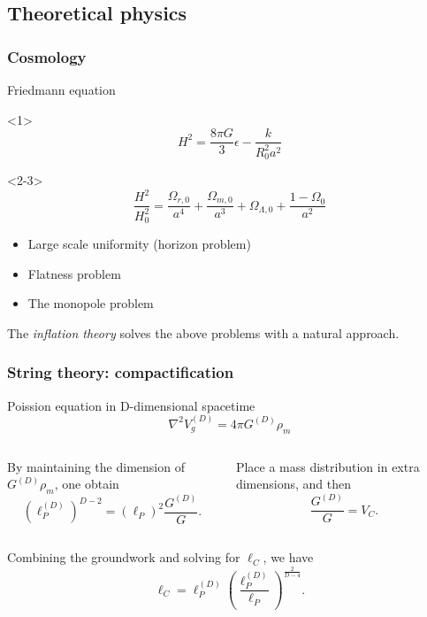 \documentclass{beamer}
\begin{document}
\subsection{Theoretical physics}
\begin{frame}
  \frametitle{Cosmology}
    \begin{alertblock}{Friedmann equation}
      \begin{onlyenv}<1>
        $$H^2 = \frac{8\pi G}{3}\epsilon-\frac{k}{R_0^2a^2}$$
      \end{onlyenv}
      \begin{onlyenv}<2-3>
        $$\frac{H^2}{H_0^2} =
        \frac{\Omega_{r,0}}{a^4} + \frac{\Omega_{m,0}}{a^3} +
        \Omega_{\Lambda,0} + \frac{1-\Omega_0}{a^2}$$
      \end{onlyenv}
  \end{alertblock}
  
  \begin{itemize}
  \item<3> Large scale uniformity (horizon problem)
  \item<3> Flatness problem
  \item<3> The monopole problem
  \end{itemize}
  The \textit{inflation theory} solves the above problems with a natural
  approach.

\end{frame}


\begin{frame}
  \frametitle{String theory: compactification}
  \begin{alertblock}{Poission equation in D-dimensional spacetime}
    $$\nabla^2V_g^{(D)} = 4\pi G^{(D)}\rho_m$$ 
  \end{alertblock}
  \begin{columns}
    By maintaining the dimension of $G^{(D)}\rho_m$, one obtain
    $$(\ell_P^{(D)})^{D-2} = (\ell_P)^2\frac{G^{(D)}}{G}.$$

    Place a mass distribution in extra dimensions, and then 
    $$\frac{G^{(D)}}{G} = V_C.$$
  \end{columns} \pause
  Combining the groundwork and solving for $\ell_C$, we have
  $$\ell_C = \ell_P^{(D)}(\frac{\ell_P^{(D)}}{\ell_P})^{\frac{2}{D-4}}.$$
  
\end{frame}
\end{document}
